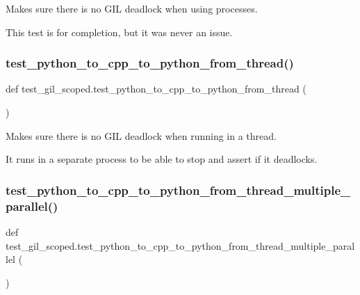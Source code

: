 \begin{DoxyVerb}Makes sure there is no GIL deadlock when using processes.

This test is for completion, but it was never an issue.
\end{DoxyVerb}
 \mbox{\label{namespacetest__gil__scoped_ac54f4e3b85ef926abdcaef7eb30da388}} 
\subsubsection{\texorpdfstring{test\_python\_to\_cpp\_to\_python\_from\_thread()}{test\_python\_to\_cpp\_to\_python\_from\_thread()}}
{\footnotesize\ttfamily def test\+\_\+gil\+\_\+scoped.\+test\+\_\+python\+\_\+to\+\_\+cpp\+\_\+to\+\_\+python\+\_\+from\+\_\+thread (\begin{DoxyParamCaption}{ }\end{DoxyParamCaption})}

\begin{DoxyVerb}Makes sure there is no GIL deadlock when running in a thread.

It runs in a separate process to be able to stop and assert if it deadlocks.
\end{DoxyVerb}
 \mbox{\label{namespacetest__gil__scoped_a888e2a5b3e2e85735b366cedcb36b949}} 
\subsubsection{\texorpdfstring{test\_python\_to\_cpp\_to\_python\_from\_thread\_multiple\_parallel()}{test\_python\_to\_cpp\_to\_python\_from\_thread\_multiple\_parallel()}}
{\footnotesize\ttfamily def test\+\_\+gil\+\_\+scoped.\+test\+\_\+python\+\_\+to\+\_\+cpp\+\_\+to\+\_\+python\+\_\+from\+\_\+thread\+\_\+multiple\+\_\+parallel (\begin{DoxyParamCaption}{ }\end{DoxyParamCaption})}

